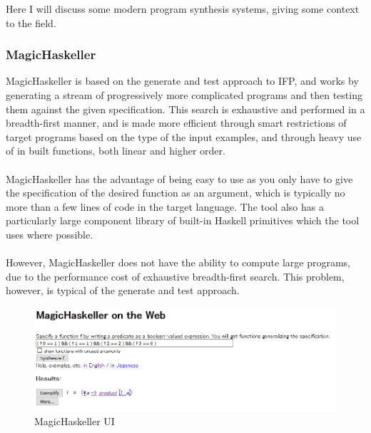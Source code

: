 Here I will discuss some modern program synthesis systems, giving some context to the field.

\subsubsection{MagicHaskeller}
MagicHaskeller \cite{Katayama2012} is based on the generate and test approach to IFP, and works by generating a stream of progressively more complicated programs and then testing them against the given specification. This search is exhaustive and performed in a breadth-first manner, and is made more efficient through smart restrictions of target programs based on the type of the input examples, and through heavy use of in built functions, both linear and higher order. \\ \\
MagicHaskeller has the advantage of being easy to use as you only have to give the specification of the desired function as an argument, which is typically no more than a few lines of code in the target language. The tool also has a particularly large component library of built-in Haskell primitives which the tool uses where possible.\\ \\
However, MagicHaskeller does not have the ability to compute large programs, due to the performance cost of exhaustive breadth-first search. This problem, however, is typical of the generate and test approach.

\begin{figure}[h!]
\centering
\includegraphics[width=\textwidth]{C7/magichaskeller.png}
\caption{MagicHaskeller UI}
\label{fig:magichaskeller}
\end{figure}

